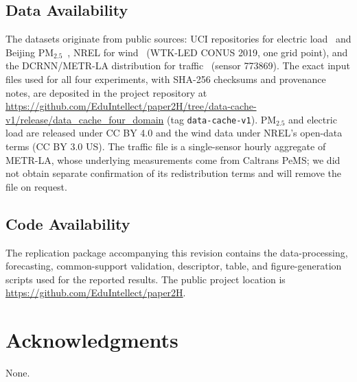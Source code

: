 \documentclass[pdflatex]{sn-jnl}
\begin{document}
\subsection*{Data Availability}
The datasets originate from public sources: UCI repositories for electric
load~\citep{trindade2015} and Beijing PM$_{2.5}$~\citep{chen2015beijingpm25}, NREL
for wind~\citep{draxl2015} (WTK-LED CONUS 2019, one grid point), and the
DCRNN/METR-LA distribution for traffic~\citep{li2018dcrnn} (sensor 773869). The
exact input files used for all four experiments, with SHA-256 checksums and
provenance notes, are deposited in the project repository at
\url{https://github.com/EduIntellect/paper2H/tree/data-cache-v1/release/data_cache_four_domain}
(tag \texttt{data-cache-v1}). PM$_{2.5}$ and electric load are released under CC BY 4.0 and the wind data
under NREL's open-data terms (CC BY 3.0 US). The traffic file is a single-sensor hourly
aggregate of METR-LA, whose underlying measurements come from Caltrans PeMS; we did not obtain
separate confirmation of its redistribution terms and will remove the file on request.

\subsection*{Code Availability}
The replication package accompanying this revision contains the data-processing,
forecasting, common-support validation, descriptor, table, and figure-generation
scripts used for the reported results. The public project location is
\url{https://github.com/EduIntellect/paper2H}.

\section*{Acknowledgments}
None.


\begingroup
{}


\endgroup
\end{document}
